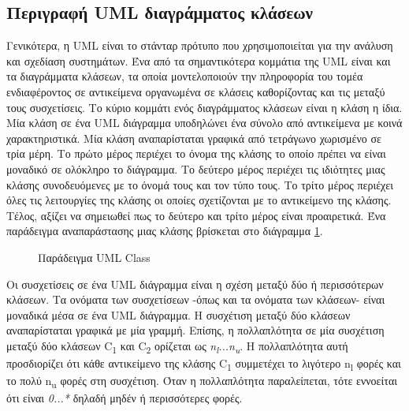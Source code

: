\documentclass[oneside, 12pt]{book}
\begin{document}
\subsection{Περιγραφή UML διαγράμματος κλάσεων}
Γενικότερα, η UML είναι το στάνταρ πρότυπο που χρησιμοποιείται για την 
ανάλυση και σχεδίαση συστημάτων. Ένα από τα σημαντικότερα κομμάτια της 
UML είναι και τα διαγράμματα κλάσεων, τα οποία μοντελοποιούν την 
πληροφορία του τομέα ενδιαφέροντος σε αντικείμενα οργανωμένα σε 
κλάσεις καθορίζοντας και τις μεταξύ τους συσχετίσεις. Το κύριο κομμάτι 
ενός διαγράμματος κλάσεων είναι η κλάση η ίδια. Μία κλάση σε ένα UML 
διάγραμμα υποδηλώνει ένα σύνολο από αντικείμενα με κοινά 
χαρακτηριστικά. Μία κλάση αναπαρίσταται γραφικά από τετράγωνο 
χωρισμένο σε τρία μέρη. Το πρώτο μέρος περιέχει το όνομα της κλάσης το 
οποίο πρέπει να είναι μοναδικό σε ολόκληρο το διάγραμμα. Το δεύτερο 
μέρος περιέχει τις ιδιότητες μιας κλάσης συνοδευόμενες με το όνομά 
τους και τον τύπο τους. Το τρίτο μέρος περιέχει όλες τις λειτουργίες 
της κλάσης οι οποίες σχετίζονται με το αντικείμενο της κλάσης. Τέλος, 
αξίζει να σημειωθεί πως το δεύτερο και τρίτο μέρος είναι προαιρετικά.
Ένα παράδειγμα αναπαράστασης μιας κλάσης βρίσκεται στο διάγραμμα \ref{fig:uml_diagram_class}.
\begin{figure}[h]
\centering
{}
\caption{\label{fig:uml_diagram_class}Παράδειγμα UML Class}
\end{figure}

Οι συσχετίσεις σε ένα UML διάγραμμα είναι η σχέση μεταξύ δύο ή 
περισσότερων κλάσεων. Τα ονόματα των συσχετίσεων -όπως και τα ονόματα 
των κλάσεων- είναι μοναδικά μέσα σε ένα UML διάγραμμα. Η συσχέτιση 
μεταξύ δύο κλάσεων αναπαρίσταται γραφικά με μία γραμμή. Επίσης, η 
πολλαπλότητα σε μία συσχέτιση μεταξύ δύο κλάσεων C\textsubscript{1} 
και C\textsubscript{2} ορίζεται ως 
\textit{n\textsubscript{l}...n\textsubscript{u}}. Η πολλαπλότητα αυτή 
προσδιορίζει ότι κάθε αντικείμενο της κλάσης C\textsubscript{1} 
συμμετέχει το λιγότερο n\textsubscript{l} φορές και το πολύ 
n\textsubscript{u} φορές στη συσχέτιση. Όταν η πολλαπλότητα 
παραλείπεται, τότε εννοείται ότι είναι \textit{0...*} δηλαδή μηδέν ή 
περισσότερες φορές. 
\end{document}
